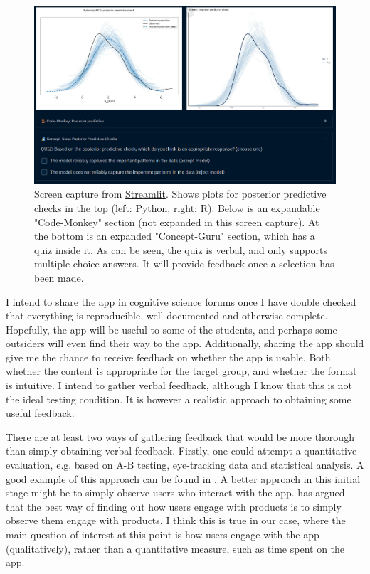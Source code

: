 \documentclass[12pt]{article}
\begin{document}
\begin{figure}[H]
    \centerline{\includegraphics[scale = 0.5]{../img/Quiz-image.png}}
    \caption{Screen capture from
    \href{https://share.streamlit.io/victor-m-p/bayesworkflow/main/BayesWorkflow.py}{Streamlit}.
    Shows plots for posterior predictive checks in the top (left: Python,
    right: R). Below is an expandable "Code-Monkey" section (not expanded
    in this screen capture). At the bottom is
    an expanded "Concept-Guru" section, which has a quiz inside it.
    As can be seen, the quiz is verbal, and only supports multiple-choice answers.
    It will provide feedback once a selection has been made.
    }
\end{figure}

\vspace{5mm}

I intend to share the app in cognitive science forums once I have double checked
that everything is reproducible, well documented and otherwise complete. Hopefully,
the app will be useful to some of the students, and perhaps some outsiders will even
find their way to the app. Additionally, sharing the app should give me the chance
to receive feedback on whether the app is usable. Both whether the content is
appropriate for the target group,
and whether the format is intuitive. I intend to gather verbal feedback,
although I know that this is not the ideal testing condition.
It is however a realistic approach to obtaining some useful feedback.

\vspace{5mm}

There are at least two ways of gathering feedback that would be more thorough
than simply obtaining verbal feedback. Firstly, one could attempt a quantitative evaluation,
e.g. based on A-B testing, eye-tracking data and statistical analysis.
A good example of this approach can be found in \textcite{sutcliffe2016}.
A better approach in this initial stage might be to simply observe users who interact
with the app. \textcite{norman1999} has argued that the best way of finding
out how users engage with products is to simply observe them engage with products.
I think this is true in our case, where the main question of interest at this
point is how users engage with the app (qualitatively), rather than a
quantitative measure, such as time spent on the app.
\end{document}
